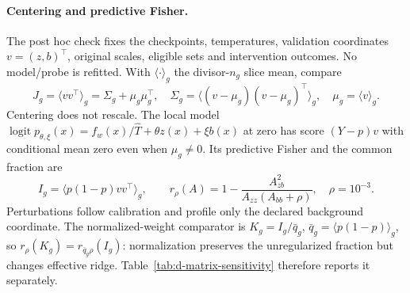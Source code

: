 \paragraph{Centering and predictive Fisher.}
The post hoc check fixes the checkpoints, temperatures, validation coordinates $v=(z,b)^\top$, original scales, eligible sets and intervention outcomes. No model/probe is refitted. With $\langle\cdot\rangle_g$ the divisor-$n_g$ slice mean, compare
\[
J_g=\langle vv^\top\rangle_g=\Sigma_g+\mu_g\mu_g^\top,\quad
\Sigma_g=\langle(v-\mu_g)(v-\mu_g)^\top\rangle_g,\quad \mu_g=\langle v\rangle_g.
\]
Centering does not rescale. The local model $\operatorname{logit}p_{\theta,\xi}(x)=f_w(x)/\widehat T+\theta z(x)+\xi b(x)$ at zero has score $(Y-p)v$ with conditional mean zero even when $\mu_g\ne0$. Its predictive Fisher and the common fraction are
\[
I_g=\langle p(1-p)vv^\top\rangle_g,\qquad
r_\rho(A)=1-\frac{A_{zb}^2}{A_{zz}(A_{bb}+\rho)},\quad\rho=10^{-3}.
\]
Perturbations follow calibration and profile only the declared background coordinate. The normalized-weight comparator is $K_g=I_g/\bar q_g$, $\bar q_g=\langle p(1-p)\rangle_g$, so $r_\rho(K_g)=r_{\bar q_g\rho}(I_g)$: normalization preserves the unregularized fraction but changes effective ridge. Table~\ref{tab:d-matrix-sensitivity} therefore reports it separately.

